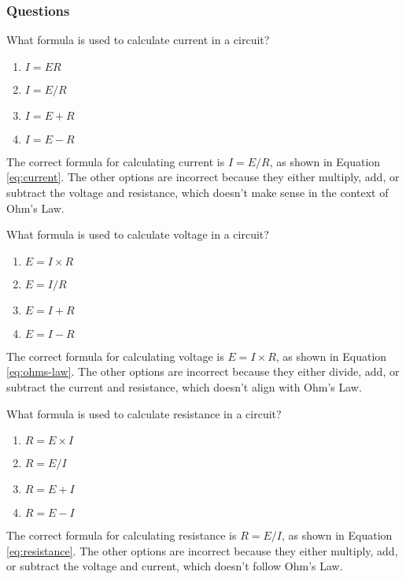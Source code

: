 \subsubsection{Questions}

\begin{tcolorbox}[colback=gray!10!white,colframe=black!75!black,title={T5D01}]
    What formula is used to calculate current in a circuit?
    \begin{enumerate}[label=\Alph*),noitemsep]
        \item \(I = E R\)
        \item \textbf{\(I = E / R\)}
        \item \(I = E + R\)
        \item \(I = E - R\)
    \end{enumerate}
\end{tcolorbox}
The correct formula for calculating current is \(I = E / R\), as shown in Equation \ref{eq:current}. The other options are incorrect because they either multiply, add, or subtract the voltage and resistance, which doesn’t make sense in the context of Ohm’s Law.

\begin{tcolorbox}[colback=gray!10!white,colframe=black!75!black,title={T5D02}]
    What formula is used to calculate voltage in a circuit?
    \begin{enumerate}[label=\Alph*),noitemsep]
        \item \textbf{\(E = I \times R\)}
        \item \(E = I / R\)
        \item \(E = I + R\)
        \item \(E = I - R\)
    \end{enumerate}
\end{tcolorbox}
The correct formula for calculating voltage is \(E = I \times R\), as shown in Equation \ref{eq:ohms-law}. The other options are incorrect because they either divide, add, or subtract the current and resistance, which doesn’t align with Ohm’s Law.

\begin{tcolorbox}[colback=gray!10!white,colframe=black!75!black,title={T5D03}]
    What formula is used to calculate resistance in a circuit?
    \begin{enumerate}[label=\Alph*),noitemsep]
        \item \(R = E \times I\)
        \item \textbf{\(R = E / I\)}
        \item \(R = E + I\)
        \item \(R = E - I\)
    \end{enumerate}
\end{tcolorbox}
The correct formula for calculating resistance is \(R = E / I\), as shown in Equation \ref{eq:resistance}. The other options are incorrect because they either multiply, add, or subtract the voltage and current, which doesn’t follow Ohm’s Law.

